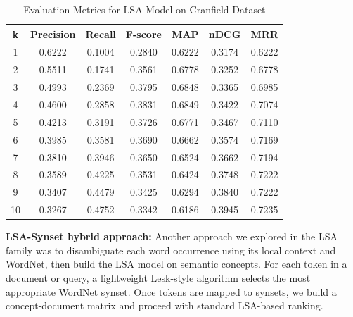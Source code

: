\begin{table}[H]
\centering
\small
\begin{tabular}{|c|ccc|ccc|}
\hline
\textbf{k} & \textbf{Precision} & \textbf{Recall} & \textbf{F-score} & \textbf{MAP} & \textbf{nDCG} & \textbf{MRR} \\ \hline
1  & 0.6222 & 0.1004 & 0.2840 & 0.6222 & 0.3174 & 0.6222 \\
2  & 0.5511 & 0.1741 & 0.3561 & 0.6778 & 0.3252 & 0.6778 \\
3  & 0.4993 & 0.2369 & 0.3795 & 0.6848 & 0.3365 & 0.6985 \\
4  & 0.4600 & 0.2858 & 0.3831 & 0.6849 & 0.3422 & 0.7074 \\
5  & 0.4213 & 0.3191 & 0.3726 & 0.6771 & 0.3467 & 0.7110 \\
6  & 0.3985 & 0.3581 & 0.3690 & 0.6662 & 0.3574 & 0.7169 \\
7  & 0.3810 & 0.3946 & 0.3650 & 0.6524 & 0.3662 & 0.7194 \\
8  & 0.3589 & 0.4225 & 0.3531 & 0.6424 & 0.3748 & 0.7222 \\
9  & 0.3407 & 0.4479 & 0.3425 & 0.6294 & 0.3840 & 0.7222 \\
10 & 0.3267 & 0.4752 & 0.3342 & 0.6186 & 0.3945 & 0.7235 \\ \hline
\end{tabular}
\caption{Evaluation Metrics for LSA Model on Cranfield Dataset}
\end{table}

\textbf{LSA-Synset hybrid approach:}
Another approach we explored in the LSA family was to disambiguate each word occurrence using its local context and WordNet, then build the LSA model on semantic concepts. For each token in a document or query, a lightweight Lesk-style algorithm selects the most appropriate WordNet synset. Once tokens are mapped to synsets, we build a concept-document matrix and proceed with standard LSA-based ranking.

